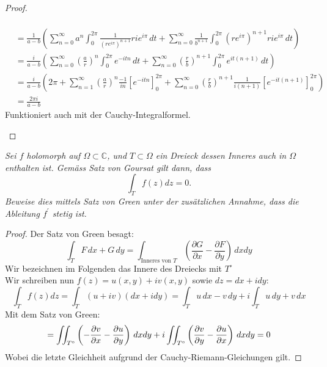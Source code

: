 \documentclass[11pt]{article}
\newenvironment{problem}[2][Beispiel]{
    \begin{trivlist}
        \item[\hskip \labelsep {\bfseries #1}\hskip \labelsep {\bfseries #2.}] \itshape}{
    \end{trivlist}\normalshape
}
\begin{document}
\begin{proof}
\begin{enumerate}[label = (\alph*)]
$$\begin{aligned}
                  \\&= \frac{1}{a-b}\left(\sum_{n=0}^\infty a^n \int_0^{2\pi} \frac{1}{(re^{i\pi})^{n+1}} rie^{i\pi}\,dt+
                  \sum_{n=0}^\infty\frac{1}{b^{n+1}}\int_0^{2\pi} (re^{i\pi})^{n+1} rie^{i\pi}\,dt\right)
                  \\&= \frac{i}{a-b}\left(\sum_{n=0}^\infty \left(\frac{a}{r}\right)^n \int_0^{2\pi}
                  e^{-itn} \,dt+\sum_{n=0}^\infty\left(\frac{r}{b}\right)^{n+1}\int_0^{2\pi}e^{it(n+1)} \,dt\right)
                  \\&= \frac{i}{a-b}\left(2\pi+ \sum_{n=1}^\infty \left(\frac{a}{r}\right)^n \frac{-1}{in}
                  [e^{-itn}]_0^{2\pi}+\sum_{n=0}^\infty\left(\frac{r}{b}\right)^{n+1}\frac{1}{i(n+1)}
                  [e^{-it(n+1)}]_0^{2\pi}\right)
                  \\&= \frac{2\pi i}{a-b}
            \end{aligned}$$
            Funktioniert auch mit der Cauchy-Integralformel.
        \end{enumerate}
    \end{proof}

    \begin{problem}{5}
        Sei $f$ holomorph auf $\Omega \subset \mathbb{C}$, und $T \subset \Omega$ ein Dreieck dessen
        Inneres auch in $\Omega$ enthalten ist. Gemäss Satz von Goursat gilt dann, dass
        $$
        \int_T f(z) d z=0 .
        $$
        Beweise dies mittels Satz von Green unter der zusätzlichen Annahme, dass die Ableitung $f^{\prime}$
        stetig ist.
    \end{problem}

    \begin{proof}
        Der Satz von Green besagt:
        $$\int_T F\,dx +G\,dy = \int_{\text{Inneres von }T}
        \left(\frac{\partial G}{\partial x}-\frac{\partial F}{\partial y}\right)\,dxdy$$
        Wir bezeichnen im Folgenden das Innere des Dreiecks mit $T^\circ$\\
        Wir schreiben nun $f(z) = u(x,y)+i v(x,y)$ sowie $dz = dx + idy$:
        $$\int_T f(z) d z = \int_T (u+iv)(dx+idy) = \int_T u\,dx - v\,dy + i \int_T u\,dy+v\,dx$$
        Mit dem Satz von Green:
        $$ = \int\hspace{-5pt}\int_{T^\circ} \left(-\frac{\partial v}{\partial x}-
        \frac{\partial u}{\partial y}\right)\,dxdy+i\int\hspace{-5pt}\int_{T^\circ} \left(\frac{\partial v}
        {\partial y}-\frac{\partial u}{\partial x}\right)\,dxdy = 0$$
        Wobei die letzte Gleichheit aufgrund der Cauchy-Riemann-Gleichungen gilt.
    \end{proof}
\end{document}
